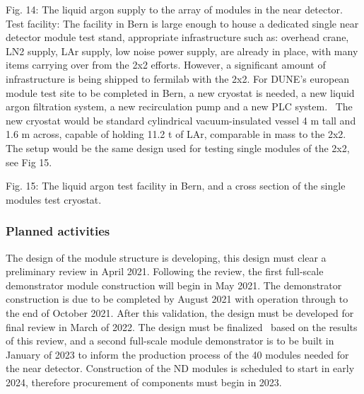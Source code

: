 Fig. 14: The liquid argon supply to the array of modules in the near detector.
Test facility: The facility in Bern is large enough to house a dedicated single near detector module test stand, appropriate infrastructure such as: overhead crane, LN2 supply, LAr supply, low noise power supply, are already in place, with many items carrying over from the 2x2 efforts. However, a significant amount of infrastructure is being shipped to fermilab with the 2x2. For DUNE’s european module test site to be completed in Bern, a new cryostat is needed, a new liquid argon filtration system, a new recirculation pump and a new PLC system.  The new cryostat would be standard cylindrical vacuum-insulated vessel 4 m tall and 1.6 m across, capable of holding 11.2 t of LAr, comparable in mass to the 2x2. The setup would be the same design used for testing single modules of the 2x2, see Fig 15.
 

Fig. 15: The liquid argon test facility in Bern, and a cross section of the single modules test cryostat.

\subsubsection{Planned activities}
The design of the module structure is developing, this design must clear a preliminary review in April 2021. Following the review, the first full-scale demonstrator module construction will begin in May 2021. The demonstrator construction is due to be completed by August 2021 with operation through to the end of October 2021. After this validation, the design must be developed for final review in March of 2022. The design must be finalized  based on the results of this review, and a second full-scale module demonstrator is to be built in January of 2023 to inform the production process of the 40 modules needed for the near detector. Construction of the ND modules is scheduled to start in early 2024, therefore procurement of components must begin in 2023.

